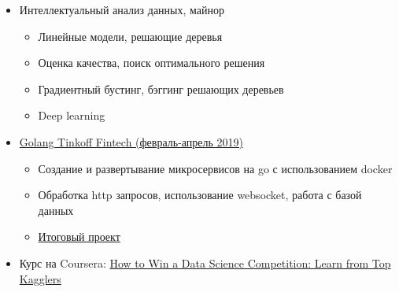 \documentclass[a4paper,11pt]{article}
\begin{document}
\begin{itemize}
 
 \item Интеллектуальный анализ данных, майнор
 \begin{itemize}
 	\item Линейные модели, решающие деревья
 	\item Оценка качества, поиск оптимального решения
 	\item Градиентный бустинг, бэггинг решающих деревьев
 	\item Deep learning
\end{itemize}
 
  \item
   \href{https://fintech.tinkoff.ru/media/public/filer_public/fd/b2/fdb28d5c-9b3a-419a-8d0d-e76f72e93200/solodiankin_andrei_dimploma.pdf}{ Golang Tinkoff Fintech (февраль-апрель 2019)}
   \begin{itemize}
  	\item Создание и развертывание микросервисов на go с использованием docker
  	\item Обработка http запросов, использование websocket, работа с базой данных
    \item \href{https://github.com/andrsolo21/Tinkoff_Golang}{ Итоговый проект }
  \end{itemize}

	\item Курс на Coursera: \href{https://www.coursera.org/learn/competitive-data-science}{How to Win a Data Science Competition: Learn from Top Kagglers}
\end{itemize}
\end{document}
